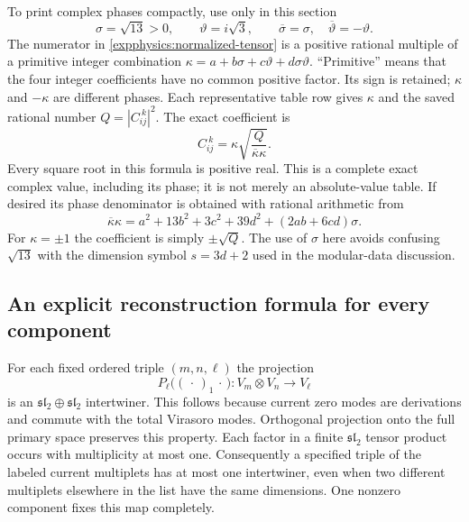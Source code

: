 To print complex phases compactly, use only in this section
\[
 \sigma=\sqrt{13}>0,\qquad\vartheta=i\sqrt3,
 \qquad\overline\sigma=\sigma,\quad
 \overline\vartheta=-\vartheta.
\]
The numerator in \eqref{expphysics:normalized-tensor} is a positive
rational multiple of a primitive integer combination
$\kappa=a+b\sigma+c\vartheta+d\sigma\vartheta$. ``Primitive''
means that the four integer coefficients have no common positive
factor. Its sign is retained; $\kappa$ and $-\kappa$ are different
phases. Each representative table row gives $\kappa$ and the saved
rational number $Q=|C_{ij}^{\ k}|^2$. The exact coefficient is
\begin{equation}
 \boxed{\displaystyle
 C_{ij}^{\ k}=\kappa
          \sqrt{\frac{Q}{\overline\kappa\kappa}}.}
 \label{expphysics:phase-reading}
\end{equation}
Every square root in this formula is positive real. This is a
complete exact complex value, including its phase; it is not merely
an absolute-value table. If desired its phase denominator is obtained
with rational arithmetic from
\[
 \overline\kappa\kappa=
 a^2+13b^2+3c^2+39d^2+(2ab+6cd)\sigma.
\]
For $\kappa=\pm1$ the coefficient is simply $\pm\sqrt Q$.
The use of $\sigma$ here avoids confusing $\sqrt{13}$ with the
dimension symbol $s=3d+2$ used in the modular-data discussion.

\subsection{An explicit reconstruction formula for every component}
\label{expphysics:transvectant}

For each fixed ordered triple $(m,n,\ell)$ the projection
\[
 P_\ell\bigl((\,\cdot\,)_1\,\cdot\,\bigr):V_m\otimes V_n\longrightarrow V_\ell
\]
is an $\mathfrak{sl}_2\oplus\mathfrak{sl}_2$ intertwiner. This
follows because current zero modes are derivations and commute with
the total Virasoro modes. Orthogonal projection onto the full
primary space preserves this property. Each factor in a finite
$\mathfrak{sl}_2$ tensor product occurs with multiplicity at most
one. Consequently a specified triple of the labeled current
multiplets has at most one intertwiner, even when two different
multiplets elsewhere in the list have the same dimensions.
One nonzero component fixes this map completely.

